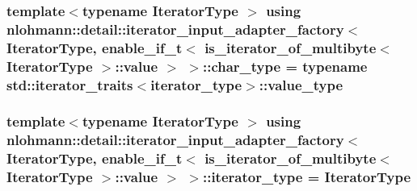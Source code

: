 \subsubsection[{\texorpdfstring{char\+\_\+type}{char_type}}]{\setlength{\rightskip}{0pt plus 5cm}template$<$typename Iterator\+Type $>$ using {\bf nlohmann\+::detail\+::iterator\+\_\+input\+\_\+adapter\+\_\+factory}$<$ Iterator\+Type, {\bf enable\+\_\+if\+\_\+t}$<$ {\bf is\+\_\+iterator\+\_\+of\+\_\+multibyte}$<$ Iterator\+Type $>$\+::{\bf value} $>$ $>$\+::{\bf char\+\_\+type} =  typename std\+::iterator\+\_\+traits$<${\bf iterator\+\_\+type}$>$\+::value\+\_\+type}\hypertarget{structnlohmann_1_1detail_1_1iterator__input__adapter__factory_3_01IteratorType_00_01enable__if__0e86378a778d78dd2284e92dc30f4902_aff521be1855964b6ec371eed2ca2590f}{}\label{structnlohmann_1_1detail_1_1iterator__input__adapter__factory_3_01IteratorType_00_01enable__if__0e86378a778d78dd2284e92dc30f4902_aff521be1855964b6ec371eed2ca2590f}
\subsubsection[{\texorpdfstring{iterator\+\_\+type}{iterator_type}}]{\setlength{\rightskip}{0pt plus 5cm}template$<$typename Iterator\+Type $>$ using {\bf nlohmann\+::detail\+::iterator\+\_\+input\+\_\+adapter\+\_\+factory}$<$ Iterator\+Type, {\bf enable\+\_\+if\+\_\+t}$<$ {\bf is\+\_\+iterator\+\_\+of\+\_\+multibyte}$<$ Iterator\+Type $>$\+::{\bf value} $>$ $>$\+::{\bf iterator\+\_\+type} =  Iterator\+Type}\hypertarget{structnlohmann_1_1detail_1_1iterator__input__adapter__factory_3_01IteratorType_00_01enable__if__0e86378a778d78dd2284e92dc30f4902_a1c42a47cd6cd71146cf2851d76165610}{}\label{structnlohmann_1_1detail_1_1iterator__input__adapter__factory_3_01IteratorType_00_01enable__if__0e86378a778d78dd2284e92dc30f4902_a1c42a47cd6cd71146cf2851d76165610}


